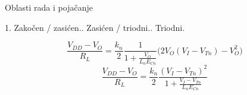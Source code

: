 \begin{frame}[label=09_1-s015]{Oblasti rada i pojačanje}\setlength{\parskip}{2pt}\setlength{\abovedisplayskip}{4pt}\setlength{\belowdisplayskip}{4pt}\setlength{\abovedisplayshortskip}{3pt}\setlength{\belowdisplayshortskip}{3pt}
\begin{center}\hspace{10mm}\end{center}1. Zakočen / zasićen.. Zasićen / triodni.. Triodni.
\par\[\frac{V_{DD}-V_O}{R_L}=\frac{k_n}{2}\frac1{1+\frac{V_O}{L_nE_{Cn}}}\bigl(2V_O(V_I-V_{Tn})-V_O^2\bigr)\]
\[\frac{V_{DD}-V_O}{R_L}=\frac{k_n}{2}\frac{(V_I-V_{Tn})^2}{1+\frac{V_I-V_{Tn}}{L_nE_{Cn}}}\]

\end{frame}
